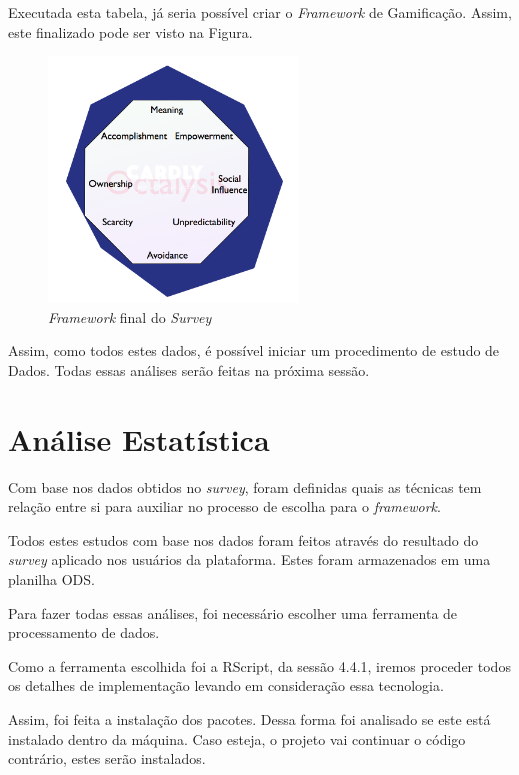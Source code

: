 Executada esta tabela, já seria possível criar o \textit{Framework} de Gamificação. Assim,
este finalizado pode ser visto na Figura.

\begin{figure}[h]
    \centering

    \includegraphics[width=250px, scale=1]{figuras/final_survey}
    \caption{\textit{Framework} final do \textit{Survey}}

    \label{fig:final_framework_octalisys}
\end{figure}

Assim, como todos estes dados, é possível iniciar um procedimento de estudo de Dados.
Todas essas análises serão feitas na próxima sessão.

\section{Análise Estatística}
\label{sec:implementacao_analise_estatistica}
Com base nos dados obtidos no \textit{survey}, foram definidas quais as técnicas tem relação entre si para auxiliar no processo
de escolha para o \textit{framework}.

Todos estes estudos com base nos dados foram feitos através do resultado do \textit{survey} aplicado nos usuários
da plataforma. Estes foram armazenados em uma planilha ODS.

Para fazer todas essas análises, foi necessário escolher uma ferramenta de processamento de dados.

Como a ferramenta escolhida foi a RScript, da sessão 4.4.1, iremos proceder todos os detalhes de implementação
levando em consideração essa tecnologia.

Assim, foi feita a instalação dos pacotes. Dessa forma foi  analisado
se este está instalado dentro da máquina. 
Caso esteja, o projeto vai continuar o código contrário, estes serão instalados.

